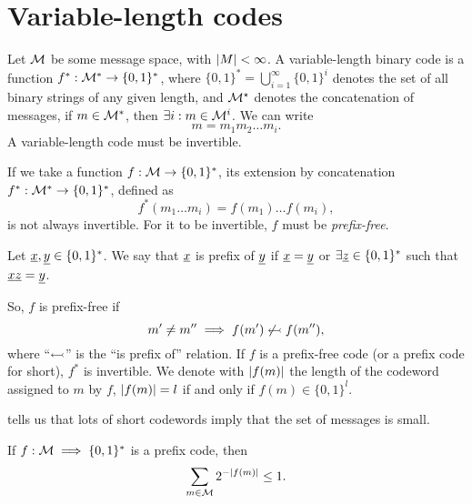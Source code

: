 \chapter{Variable-length codes}

Let $\mathcal{M}$ be some message space, with $\left|{M}\right| < \infty$.
A variable-length binary code is a function $f^{*} : \mathcal{M}^{*} \to \{0,1\}^{*}$, where $\{0, 1\}^* = \bigcup_{i = 1}^\infty \{0, 1\}^i$ denotes the set of all binary strings of any given length, and $\mathcal{M}^{\star}$ denotes the concatenation of messages, \ie if $m \in \mathcal{M}^*$, then $\exists i : m \in \mathcal{M}^i$.
We can write
\begin{equation*}
	m = m_1 m_2 \dots m_i.
\end{equation*}
A variable-length code must be invertible.

If we take a function $f : \mathcal{M} \to \{0, 1\}^*$, its extension by concatenation $f^* : \mathcal{M}^* \to \{0, 1\}^*$, defined as
\begin{equation*}
	f^*(m_1 \dots m_i) = f(m_1) \dots f(m_i),
\end{equation*}
is not always invertible.
For it to be invertible, $f$ must be \emph{prefix-free}.

Let $\underline{x}, \underline{y} \in \{0, 1\}^*$.
We say that $\underline{x}$ is prefix of $\underline{y}$ if $\underline{x} = \underline{y}$ or $\exists \underline{z} \in \{0, 1\}^*$ such that $\underline{x}\underline{z} = \underline{y}$.

So, $f$ is prefix-free if
\begin{equation*}
	m' \neq m'' \implies f(m') \not\leftarrowtail f(m''),
\end{equation*}
where ``$\leftarrowtail$'' is the ``is prefix of'' relation.
If $f$ is a prefix-free code (or a prefix code for short), $f^*$ is invertible.
We denote with $\left|{f(m)}\right|$ the length of the codeword assigned to $m$ by $f$, \ie $\left|{f(m)}\right| = l$ if and only if $f(m) \in \{0, 1\}^l$.

 tells us that lots of short codewords imply that the set of messages is small.
\begin{prop}\label{prop:kraft}
	If $f : \mathcal{M} \implies \{0, 1\}^*$ is a prefix code, then
	\begin{equation*}
		\sum_{m \in \mathcal{M}} 2^{-\left|{f(m)}\right|} \le 1.
	\end{equation*}
\end{prop}

